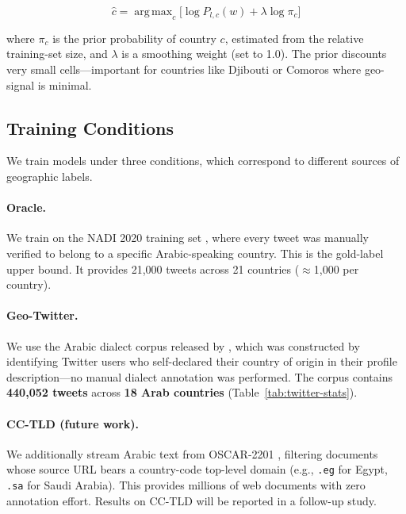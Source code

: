 \documentclass[11pt]{article}
\DeclareMathOperator*{\argmax}{arg\,max}
\begin{document}
\begin{equation}
  \hat{c} = \argmax_{c} \bigl[ \log P_{l,c}(w) + \lambda \log \pi_c \bigr]
\end{equation}

where $\pi_c$ is the prior probability of country $c$, estimated from the
relative training-set size, and $\lambda$ is a smoothing weight (set to 1.0).
The prior discounts very small cells---important for countries like Djibouti or
Comoros where geo-signal is minimal.

\subsection{Training Conditions}
\label{sec:sources}

We train models under three conditions, which correspond to different sources of
geographic labels.

\paragraph{Oracle.}  We train on the NADI 2020 training set
\cite{abdul-mageed-etal-2020-nadi}, where every tweet was manually verified to
belong to a specific Arabic-speaking country.  This is the gold-label upper
bound.  It provides 21{,}000 tweets across 21 countries ($\approx$1{,}000 per
country).

\paragraph{Geo-Twitter.}  We use the Arabic dialect corpus released by
\citet{abdelrahman-rezk-2021}, which was constructed by identifying Twitter
users who self-declared their country of origin in their profile
description---no manual dialect annotation was performed.  The corpus contains
\textbf{440{,}052 tweets} across \textbf{18 Arab countries} (Table~\ref{tab:twitter-stats}).

\paragraph{CC-TLD (future work).}  We additionally stream Arabic text from
OSCAR-2201 \cite{abadji-etal-2022-towards}, filtering documents whose source
URL bears a country-code top-level domain (e.g., \texttt{.eg} for Egypt,
\texttt{.sa} for Saudi Arabia). This provides millions of web documents with
zero annotation effort.  Results on CC-TLD will be reported in a follow-up
study.
\end{document}
